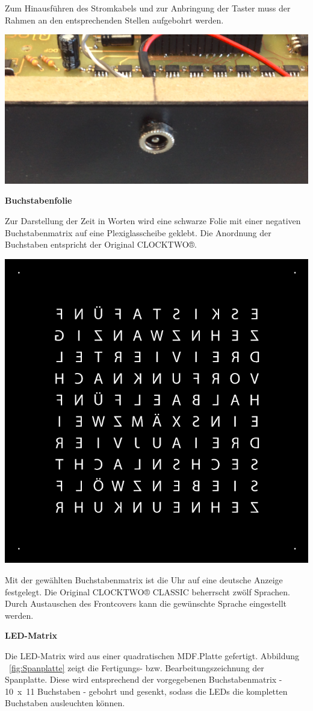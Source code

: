 \begin{multicols}{2}
{}
Zum Hinausführen des Stromkabels und zur Anbringung der Taster muss der Rahmen an den entsprechenden Stellen aufgebohrt werden. 

{
\centering \includegraphics[width=0.5\columnwidth]{Abbildungen/Konstruktion/Stecker01}

}



\textbf{Buchstabenfolie}

Zur Darstellung der Zeit in Worten wird eine schwarze Folie mit einer negativen Buchstabenmatrix auf eine Plexiglasscheibe geklebt. Die Anordnung der Buchstaben entspricht der Original CLOCKTWO®. 

{
\centering\includegraphics[width=0.75\columnwidth]{Abbildungen/Konstruktion/Buchstaben}

}
Mit der gewählten Buchstabenmatrix ist die Uhr auf eine deutsche Anzeige festgelegt. Die Original CLOCKTWO® CLASSIC beherrscht zwölf Sprachen. Durch Austauschen des Frontcovers kann die gewünschte Sprache eingestellt werden. 

\textbf{LED-Matrix}

Die LED-Matrix wird aus einer quadratischen MDF.Platte gefertigt. Abbildung ~\ref{fig:Spanplatte} zeigt die Fertigungs- bzw. Bearbeitungszeichnung der Spanplatte. Diese wird entsprechend der vorgegebenen Buchstabenmatrix -  10~x~11 Buchstaben - gebohrt und gesenkt, sodass die LEDs die kompletten Buchstaben ausleuchten können. 


\end{multicols}
